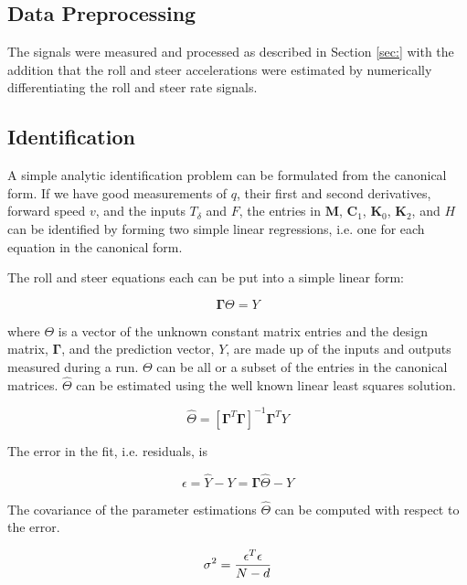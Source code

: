 \documentclass[a4paper]{article}
\begin{document}
\subsection{Data Preprocessing}

The signals were measured and processed as described in Section \ref{sec:} with
the addition that the roll and steer accelerations were estimated by
numerically differentiating the roll and steer rate signals.

\subsection{Identification}

A simple analytic identification problem can be formulated from the canonical
form. If we have good measurements of $q$, their first and second derivatives,
forward speed $v$, and the inputs $T_\delta$ and $F$, the entries in
$\mathbf{M}$, $\mathbf{C}_1$, $\mathbf{K}_0$, $\mathbf{K}_2$, and $H$ can be
identified by forming two simple linear regressions, i.e. one for each equation
in the canonical form.

The roll and steer equations each can be put into a simple linear form:

\begin{equation}
  \mathbf{\Gamma} \Theta = Y
\end{equation}

where $\Theta$ is a vector of the unknown constant matrix entries and the
design matrix, $\mathbf{\Gamma}$, and the prediction vector, $Y$, are made up
of the inputs and outputs measured during a run. $\Theta$ can be all or a
subset of the entries in the canonical matrices. $\hat{\Theta}$ can be
estimated using the well known linear least squares solution.

\begin{equation}
  \hat{\Theta} = [\mathbf{\Gamma}^T \mathbf{\Gamma}]^{-1} \mathbf{\Gamma}^T Y
  \label{eq:theta-estimate}
\end{equation}

The error in the fit, i.e. residuals, is

\begin{equation}
  \epsilon = \hat{Y} - Y = \mathbf{\Gamma} \hat{\Theta} - Y
  \label{eq:fit-error}
\end{equation}

The covariance of the parameter estimations $\hat{\Theta}$ can be computed with
respect to the error.

\begin{equation}
  \sigma^2 = \frac{\epsilon^T\epsilon}{N - d} \\
  \label{eq:fit-variance}
\end{equation}
\end{document}
